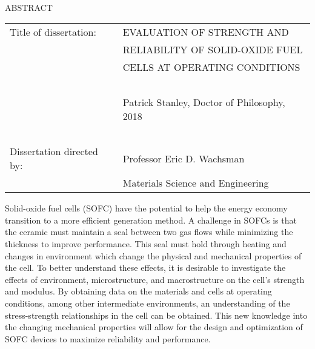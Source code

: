 

\hbox{\ }

\renewcommand{\baselinestretch}{1}
\small \normalsize

\begin{center}
\large{{ABSTRACT}}

\vspace{3em}

\end{center}
\hspace{-.15in}
\begin{tabular}{ll}
Title of dissertation:    & {\large  EVALUATION OF STRENGTH AND  }\\
&				      {\large  RELIABILITY OF SOLID-OXIDE FUEL } \\
&				      {\large  CELLS AT OPERATING CONDITIONS} \\
\ \\
&                          {\large  Patrick Stanley, Doctor of Philosophy, 2018} \\
\ \\
Dissertation directed by: & {\large  Professor Eric D. Wachsman} \\
&  				{\large	 Materials Science and Engineering } \\
\end{tabular}

\vspace{3em}

\renewcommand{\baselinestretch}{2}
\large \normalsize

Solid-oxide fuel cells (SOFC) have the potential to help the energy economy transition to a more efficient generation method.
A challenge in SOFCs is that the ceramic must maintain a seal between two gas flows while minimizing the thickness to improve performance.
This seal must hold through heating and changes in environment which change the physical and mechanical properties of the cell.
To better understand these effects, it is desirable to investigate the effects of environment, microstructure, and macrostructure on the cell's strength and modulus.
By obtaining data on the materials and cells at operating conditions, among other intermediate environments, an understanding of the stress-strength relationships in the cell can be obtained.
This new knowledge into the changing mechanical properties will allow for the design and optimization of SOFC devices to maximize reliability and performance.
